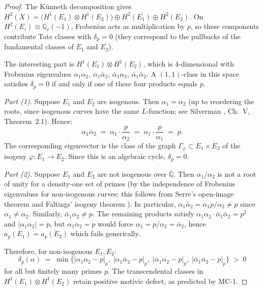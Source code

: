 \documentclass[11pt]{article}
\theoremstyle{definition}
\begin{document}
\begin{proof}
The K\"unneth decomposition gives
$H^2(X) = \bigl(H^1(E_1) \otimes H^1(E_2)\bigr) \oplus H^2(E_1) \oplus H^2(E_2)$.
On $H^2(E_i) \cong \mathbb{Q}_\ell(-1)$, Frobenius acts as multiplication by $p$,
so these components contribute Tate classes with $\delta_p = 0$ (they correspond to
the pullbacks of the fundamental classes of $E_1$ and $E_2$).

The interesting part is $H^1(E_1) \otimes H^1(E_2)$, which is 4-dimensional with
Frobenius eigenvalues $\alpha_1 \alpha_2$, $\alpha_1 \bar{\alpha}_2$,
$\bar{\alpha}_1 \alpha_2$, $\bar{\alpha}_1 \bar{\alpha}_2$.
A $(1,1)$-class in this space satisfies $\delta_p = 0$ if and only if
one of these four products equals $p$.

\emph{Part (1).}
Suppose $E_1$ and $E_2$ are isogenous.  Then $\alpha_1 = \alpha_2$
(up to reordering the roots, since isogenous curves have the same
$L$-function; see Silverman \cite{Silverman}, Ch.~V, Theorem~2.1).  Hence:
\[
  \alpha_1 \bar{\alpha}_2 \;=\; \alpha_1 \cdot \frac{p}{\alpha_2}
  \;=\; \alpha_1 \cdot \frac{p}{\alpha_1} \;=\; p.
\]
The corresponding eigenvector is the class of the graph $\Gamma_\varphi \subset E_1 \times E_2$
of the isogeny $\varphi: E_1 \to E_2$.  Since this is an algebraic cycle, $\delta_p = 0$.

\emph{Part (2).}
Suppose $E_1$ and $E_2$ are not isogenous over $\bar{\mathbb{Q}}$.
Then $\alpha_1 / \alpha_2$ is not a root of unity for a density-one set of primes
(by the independence of Frobenius eigenvalues for non-isogenous curves;
this follows from Serre's open-image theorem and Faltings' isogeny theorem \cite{Faltings}).
In particular, $\alpha_1 \bar{\alpha}_2 = \alpha_1 p / \alpha_2 \neq p$
since $\alpha_1 \neq \alpha_2$.  Similarly, $\bar{\alpha}_1 \alpha_2 \neq p$.
The remaining products satisfy $\alpha_1 \alpha_2 \cdot \bar{\alpha}_1 \bar{\alpha}_2 = p^2$
and $|\alpha_1 \alpha_2| = p$, but $\alpha_1 \alpha_2 = p$ would force
$\alpha_1 = p/\alpha_2 = \bar{\alpha}_2$, hence $a_p(E_1) = \overline{a_p(E_2)}$
which fails generically.

Therefore, for non-isogenous $E_1, E_2$:
\[
  \delta_p(\alpha) \;=\; \min\bigl\{
    |\alpha_1\alpha_2 - p|_p,\;
    |\alpha_1\bar{\alpha}_2 - p|_p,\;
    |\bar{\alpha}_1\alpha_2 - p|_p,\;
    |\bar{\alpha}_1\bar{\alpha}_2 - p|_p
  \bigr\} \;>\; 0
\]
for all but finitely many primes $p$.  The transcendental classes in
$H^1(E_1) \otimes H^1(E_2)$ retain positive motivic defect, as predicted by MC-1.
\end{proof}
\end{document}
